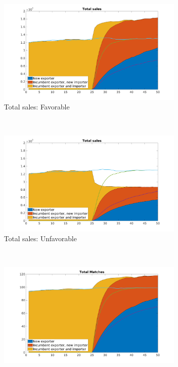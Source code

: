 \documentclass[12pt]{article}
\begin{document}
\begin{figure}[tbp]
\centering
\begin{subfigure}[b]{0.5\textwidth}
        \centering
        \includegraphics[width=\textwidth]{figures/total_sales}
        \caption{Total sales: Favorable}
    \end{subfigure} ~ 
\begin{subfigure}[b]{0.5\textwidth}
        \centering
        \includegraphics[width=\textwidth]{figures/total_sales_unf}
        \caption{Total sales: Unfavorable}
    \end{subfigure} \newline
~ 
\begin{subfigure}[b]{0.5\textwidth}
        \centering
        \includegraphics[width=\textwidth]{figures/total_matches}

\end{subfigure}
\end{figure}
\end{document}

